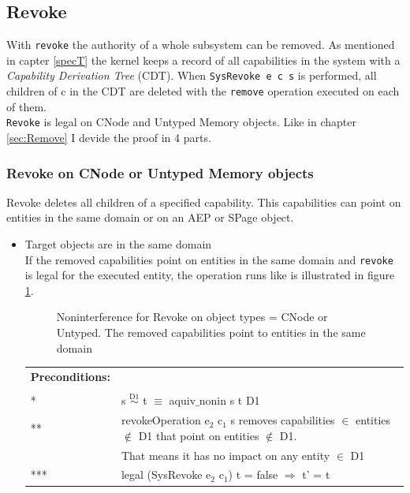 \documentclass[11pt,a4paper,twoside]{article}
\begin{document}
{\subsection{Revoke}\label{sec:Revoke}
With \texttt{revoke} the authority of a whole subsystem can be removed. As mentioned in capter \ref{specT} the kernel keeps a record of all capabilities in the system with a \textit{Capability Derivation Tree} (CDT). When \texttt{SysRevoke e c s} is performed, all children of c in the CDT are deleted with the \texttt{remove} operation executed on each of them. \\
\texttt{Revoke} is legal on CNode and Untyped Memory objects. Like in chapter \ref{sec:Remove} I devide the proof in 4 parts. 
\subsubsection{Revoke on CNode or Untyped Memory objects} 
Revoke deletes all children of a specified capability. This capabilities can point on entities in the same domain or on an AEP or SPage object. 
\begin{itemize}
\item Target objects are in the same domain \\
If the removed capabilities point on entities in the same domain and \texttt{revoke} is legal for the executed entity, the operation runs like is illustrated in figure \ref{fig:RevokeCNode}.
\begin{flushleft}
\begin{figure}[H]
\caption{Noninterference for Revoke on object types = CNode or Untyped. The removed capabilities point to entities in the same domain}
\label{fig:RevokeCNode}
\end{figure}
\end{flushleft}
\begin{tabular}{ll}
\textbf{Preconditions:} \\ \\
* & s $\overset{\text{D1}}{\sim}$ t $\equiv$ aquiv$\_$nonin s t D1	\\ 
** & revokeOperation e$_2$ c$_1$ s removes capabilities $\in$ entities $\notin$ D1 that point on entities $\notin$ D1. \\
& That means it has no impact on any entity $\in$ D1 \\ 
*** & legal (SysRevoke e$_2$ c$_1$) t = false $\Rightarrow$ t' = t
\end{tabular} \\ \\ 

\end{itemize}}
\end{document}
